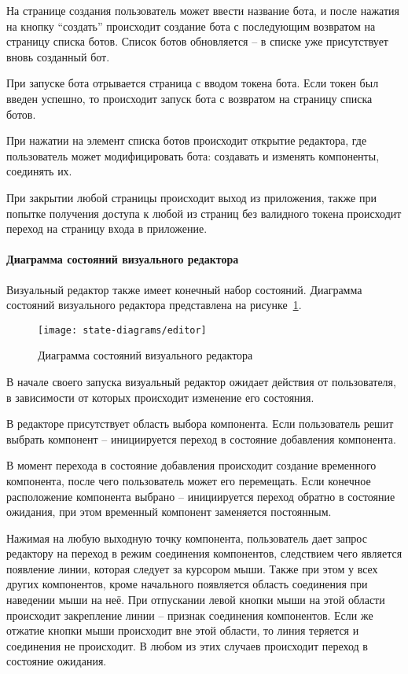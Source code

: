 На странице создания пользователь может ввести название бота, и после
нажатия на кнопку “создать” происходит создание бота с последующим
возвратом на страницу списка ботов. Список ботов обновляется – в списке уже
присутствует вновь созданный бот.

При запуске бота отрывается страница с вводом токена бота. Если токен
был введен успешно, то происходит запуск бота с возвратом на страницу
списка ботов.

При нажатии на элемент списка ботов происходит открытие редактора,
где пользователь может модифицировать бота: создавать и изменять
компоненты, соединять их.

При закрытии любой страницы происходит выход из приложения, также
при попытке получения доступа к любой из страниц без валидного токена
происходит переход на страницу входа в приложение.

\paragraph{Диаграмма состояний визуального редактора}

Визуальный редактор также имеет конечный набор состояний.
Диаграмма состояний визуального редактора представлена на
рисунке~\ref{f:editor-state-diagram}.

\begin{figure}[ht]
	\centering
	\texttt{[image: state-diagrams/editor]}
	\caption{Диаграмма состояний визуального редактора}
	\label{f:editor-state-diagram}
\end{figure}


В начале своего запуска визуальный редактор ожидает действия от
пользователя, в зависимости от которых происходит изменение его состояния.

В редакторе присутствует область выбора компонента. Если
пользователь решит выбрать компонент – инициируется переход в состояние
добавления компонента.

В момент перехода в состояние добавления происходит создание
временного компонента, после чего пользователь может его перемещать. Если
конечное расположение компонента выбрано – инициируется переход обратно
в состояние ожидания, при этом временный компонент заменяется
постоянным.

Нажимая на любую выходную точку компонента, пользователь дает
запрос редактору на переход в режим соединения компонентов, следствием
чего является появление линии, которая следует за курсором мыши. Также при
этом у всех других компонентов, кроме начального появляется область
соединения при наведении мыши на неё. При отпускании левой кнопки мыши
на этой области происходит закрепление линии – признак соединения
компонентов. Если же отжатие кнопки мыши происходит вне этой области, то
линия теряется и соединения не происходит. В любом из этих случаев
происходит переход в состояние ожидания.

